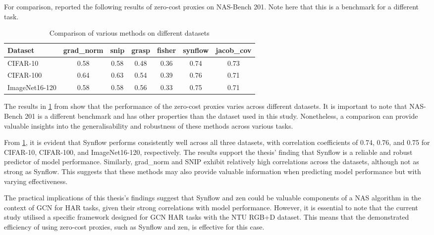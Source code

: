 For comparison, \cite{abdelfattah2021zero} reported the following results of zero-cost proxies on NAS-Bench 201. Note here that this is a benchmark for a different task. 

\begin{table}[h]
\caption{Comparison of various methods on different datasets}
\centering
\begin{adjustbox}{center}
\begin{tabular}{l|cccccc}
\textbf{Dataset} & \textbf{grad\_norm} & \textbf{snip} & \textbf{grasp} & \textbf{fisher} & \textbf{synflow} & \textbf{jacob\_cov} \\ \hline
\multicolumn{1}{l|}{CIFAR-10} & 0.58 & 0.58 & 0.48 & 0.36 & 0.74 & 0.73 \\
\multicolumn{1}{l|}{\cellcolor{verylightgray}CIFAR-100} & \cellcolor{verylightgray}0.64 & \cellcolor{verylightgray}0.63 & \cellcolor{verylightgray}0.54 & \cellcolor{verylightgray}0.39 & \cellcolor{verylightgray}0.76 & \cellcolor{verylightgray}0.71 \\
\multicolumn{1}{l|}{ImageNet16-120} & 0.58 & 0.58 & 0.56 & 0.33 & 0.75 & 0.71 \\
\end{tabular}
\end{adjustbox}
\label{tab:comparison}
\end{table}

The results in \cref{tab:comparison} from \cite{abdelfattah2021zero} show that the performance of the zero-cost proxies varies across different datasets. It is important to note that \gls{NAS}-Bench 201 is a different benchmark and has other properties than the dataset used in this study. Nonetheless, a comparison can provide valuable insights into the generalisability and robustness of these methods across various tasks.

From \cref{tab:comparison}, it is evident that \gls{Synflow} performs consistently well across all three datasets, with correlation coefficients of 0.74, 0.76, and 0.75 for CIFAR-10, CIFAR-100, and ImageNet16-120, respectively. The results support the thesis' finding that \gls{Synflow} is a reliable and robust predictor of model performance. Similarly, grad\_norm and \gls{SNIP} exhibit relatively high correlations across the datasets, although not as strong as \gls{Synflow}. This suggests that these methods may also provide valuable information when predicting model performance but with varying effectiveness.

The practical implications of this thesis's findings suggest that \gls{Synflow} and zen could be valuable components of a \gls{NAS} algorithm in the context of \gls{GCN} for \gls{HAR} tasks, given their strong correlations with model performance. However, it is essential to note that the current study utilised a specific framework designed for \gls{GCN} \gls{HAR} tasks with the NTU RGB+D dataset. This means that the demonstrated efficiency of using zero-cost proxies, such as \gls{Synflow} and zen, is effective for this case.

